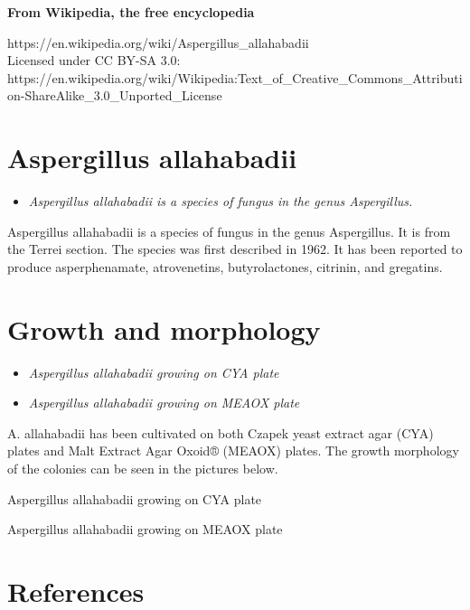 \textbf{From Wikipedia, the free encyclopedia}

https://en.wikipedia.org/wiki/Aspergillus\_allahabadii\\
Licensed under CC BY-SA 3.0:\\
https://en.wikipedia.org/wiki/Wikipedia:Text\_of\_Creative\_Commons\_Attribution-ShareAlike\_3.0\_Unported\_License

\section{Aspergillus allahabadii}\label{aspergillus-allahabadii}

\begin{itemize}
\item
  \emph{Aspergillus allahabadii is a species of fungus in the genus
  Aspergillus.}
\end{itemize}

Aspergillus allahabadii is a species of fungus in the genus Aspergillus.
It is from the Terrei section. The species was first described in 1962.
It has been reported to produce asperphenamate, atrovenetins,
butyrolactones, citrinin, and gregatins.

\section{Growth and morphology}\label{growth-and-morphology}

\begin{itemize}
\item
  \emph{Aspergillus allahabadii growing on CYA plate}
\item
  \emph{Aspergillus allahabadii growing on MEAOX plate}
\end{itemize}

A. allahabadii has been cultivated on both Czapek yeast extract agar
(CYA) plates and Malt Extract Agar Oxoid® (MEAOX) plates. The growth
morphology of the colonies can be seen in the pictures below.

Aspergillus allahabadii growing on CYA plate

Aspergillus allahabadii growing on MEAOX plate

\section{References}\label{references}
